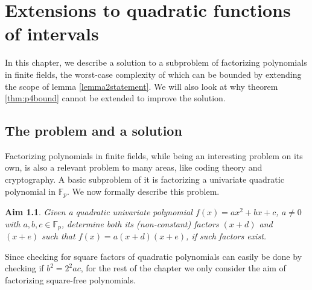 \documentclass{report}
\newtheorem*{aim*}{Aim}
\newcommand{\ignore}[1]{}
\begin{document}
\chapter{Extensions to quadratic functions of intervals}
In this chapter, we describe a solution to a subproblem of factorizing polynomials in finite fields\ignore{a practically relevant problem}, the worst-case complexity of which can be bounded by extending the scope of lemma \ref{lemma2statement}. We will also look at why theorem \ref{thm:p4bound} cannot be extended to improve the solution.
%
%
\section{The problem and a solution}
%
Factorizing polynomials in finite fields, while being an interesting problem on its own, is also a relevant problem to many areas, like coding theory and cryptography. A basic subproblem of it is factorizing a univariate quadratic polynomial in $\mathbb{F}_p$. We now formally describe this problem.
%
\begin{aim*}
Given a quadratic univariate polynomial $f(x)=ax^2+bx+c$, $a\neq 0$ with $a,b,c\in\mathbb{F}_p$, determine both its (non-constant) factors $(x+d)$ and $(x+e)$ such that $f(x)=a(x+d)(x+e)$, if such factors exist.
\end{aim*}
%
Since checking for square factors of quadratic polynomials can easily be done by checking if $b^2=2^{2}ac$, for the rest of the chapter we only consider the aim of factorizing square-free polynomials.\ignore{We next describe a method to achieve this.}
\end{document}
